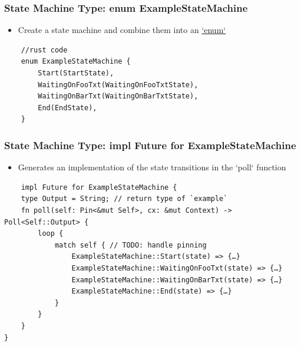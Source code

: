 \begin{frame}[fragile]
    \frametitle{State Machine Type: enum ExampleStateMachine}
% 
% 
    \begin{itemize}
        \item Create a state machine and combine them into an \href{https://doc.rust-lang.org/book/ch06-01-defining-an-enum.html}{`enum`}
    \end{itemize}

\begin{block}{}
    \begin{verbatim}
    //rust code
    enum ExampleStateMachine {
        Start(StartState),
        WaitingOnFooTxt(WaitingOnFooTxtState),
        WaitingOnBarTxt(WaitingOnBarTxtState),
        End(EndState),
    }
    \end{verbatim}
\end{block}

\end{frame}
\begin{frame}[fragile]
    \frametitle{State Machine Type: impl Future for ExampleStateMachine}
    \begin{itemize}
        \item Generates an implementation of the state transitions in the `poll` function
    \end{itemize}
% 
\begin{block}{}
    \begin{verbatim}
    impl Future for ExampleStateMachine {
    type Output = String; // return type of `example`
    fn poll(self: Pin<&mut Self>, cx: &mut Context) -> Poll<Self::Output> {
        loop {
            match self { // TODO: handle pinning
                ExampleStateMachine::Start(state) => {…}
                ExampleStateMachine::WaitingOnFooTxt(state) => {…}
                ExampleStateMachine::WaitingOnBarTxt(state) => {…}
                ExampleStateMachine::End(state) => {…}
            }
        }
    }
}
    \end{verbatim}
\end{block}
% 
\end{frame}

